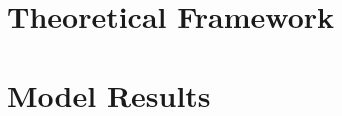 \documentclass[
	11pt, %
]{beamer}
\begin{document}
\section{Theoretical Framework} %

% 
% 
\section{Model Results} %

\end{document}
